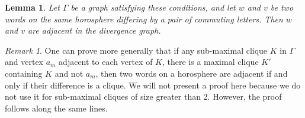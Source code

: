 \documentclass[10pt,a4paper]{amsart}
\newtheorem{lemma}[theorem]{Lemma}
\theoremstyle{definition}
\theoremstyle{remark}
\newtheorem{remark}[theorem]{Remark}
\begin{document}
	\begin{lemma}
		
		Let $\Gamma$ be a graph satisfying these conditions, and let $w$ and $v$ be two words on the same horosphere differing by a pair of commuting letters. Then $w$ and $v$ are adjacent in the divergence graph.
		
	\end{lemma}
	
	\begin{remark}
		
		One can prove more generally that if any sub-maximal clique $K$ in $\Gamma$ and vertex $a_m$ adjacent to each vertex of $K$, there is a maximal clique $K'$ containing $K$ and not $a_m$, then two words on a horosphere are adjacent if and only if their difference is a clique. We will not present a proof here because we do not use it for sub-maximal cliques of size greater than 2. However, the proof follows along the same lines.
		
	\end{remark}
	
\end{document}
